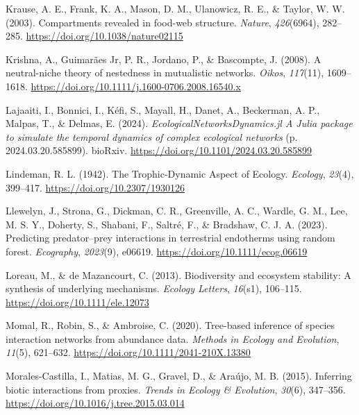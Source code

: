 \documentclass[
]{article}
\newlength{\cslhangindent}
\newenvironment{CSLReferences}[2] %
 {\begin{list}{}{%
  \setlength{\itemindent}{0pt}
  \setlength{\leftmargin}{0pt}
  \setlength{\parsep}{0pt}
  \ifodd #1
   \setlength{\leftmargin}{\cslhangindent}
   \setlength{\itemindent}{-1\cslhangindent}
  \fi
  \setlength{\itemsep}{#2\baselineskip}}}
 {\end{list}}
\begin{document}
\begin{CSLReferences}{1}{0}
Krause, A. E., Frank, K. A., Mason, D. M., Ulanowicz, R. E., \& Taylor,
W. W. (2003). Compartments revealed in food-web structure.
\emph{Nature}, \emph{426}(6964), 282--285.
\url{https://doi.org/10.1038/nature02115}

Krishna, A., Guimarães Jr, P. R., Jordano, P., \& Bascompte, J. (2008).
A neutral-niche theory of nestedness in mutualistic networks.
\emph{Oikos}, \emph{117}(11), 1609--1618.
\url{https://doi.org/10.1111/j.1600-0706.2008.16540.x}

Lajaaiti, I., Bonnici, I., Kéfi, S., Mayall, H., Danet, A., Beckerman,
A. P., Malpas, T., \& Delmas, E. (2024).
\emph{{EcologicalNetworksDynamics}.jl {A Julia} package to simulate the
temporal dynamics of complex ecological networks} (p.
2024.03.20.585899). bioRxiv.
\url{https://doi.org/10.1101/2024.03.20.585899}

Lindeman, R. L. (1942). The {Trophic-Dynamic Aspect} of {Ecology}.
\emph{Ecology}, \emph{23}(4), 399--417.
\url{https://doi.org/10.2307/1930126}

Llewelyn, J., Strona, G., Dickman, C. R., Greenville, A. C., Wardle, G.
M., Lee, M. S. Y., Doherty, S., Shabani, F., Saltré, F., \& Bradshaw, C.
J. A. (2023). Predicting predator--prey interactions in terrestrial
endotherms using random forest. \emph{Ecography}, \emph{2023}(9),
e06619. \url{https://doi.org/10.1111/ecog.06619}

Loreau, M., \& de Mazancourt, C. (2013). Biodiversity and ecosystem
stability: A synthesis of underlying mechanisms. \emph{Ecology Letters},
\emph{16}(s1), 106--115. \url{https://doi.org/10.1111/ele.12073}

Momal, R., Robin, S., \& Ambroise, C. (2020). Tree-based inference of
species interaction networks from abundance data. \emph{Methods in
Ecology and Evolution}, \emph{11}(5), 621--632.
\url{https://doi.org/10.1111/2041-210X.13380}

Morales-Castilla, I., Matias, M. G., Gravel, D., \& Araújo, M. B.
(2015). Inferring biotic interactions from proxies. \emph{Trends in
Ecology \& Evolution}, \emph{30}(6), 347--356.
\url{https://doi.org/10.1016/j.tree.2015.03.014}


\end{CSLReferences}
\end{document}

